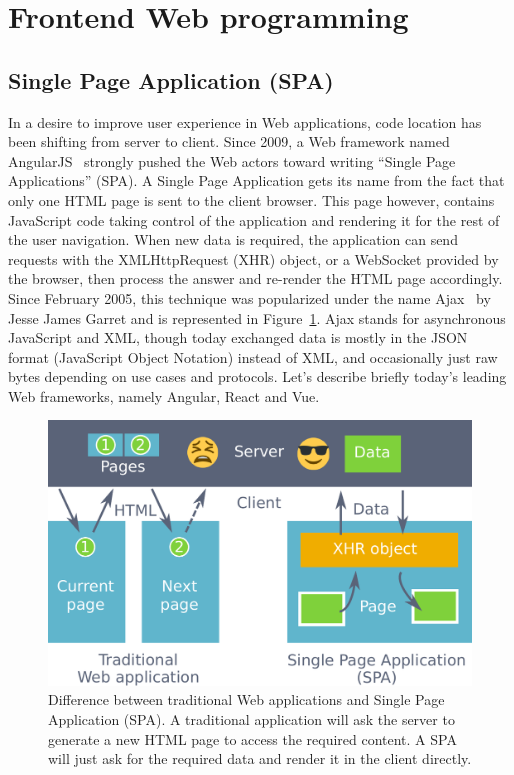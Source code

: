 \section{Frontend Web programming}%
\label{sec:frontend_web_programming}


\subsection{Single Page Application (SPA)}%
\label{sub:single_page_application_spa_}

In a desire to improve user experience in Web applications,
code location has been shifting from server to client.
Since 2009, a Web framework named AngularJS~\cite{hevery2009declarative} strongly pushed
the Web actors toward writing ``Single Page Applications'' (SPA).
A Single Page Application gets its name from the fact that only one
HTML page is sent to the client browser.
This page however, contains JavaScript code taking control
of the application and rendering it for the rest of the user navigation.
When new data is required, the application can send requests
with the XMLHttpRequest (XHR) object, or a WebSocket provided by the browser,
then process the answer and re-render the HTML page accordingly.
Since February 2005, this technique was popularized under the name Ajax~\cite{ajax}
by Jesse James Garret and is represented in Figure~\ref{fig:spa}.
Ajax stands for asynchronous JavaScript and XML,
though today exchanged data is mostly in the JSON format (JavaScript Object Notation) instead of XML,
and occasionally just raw bytes depending on use cases and protocols.
Let's describe briefly today's leading Web frameworks, namely Angular, React and Vue.

\begin{figure}[ht]
	\centering
	\includegraphics[width=1.0\linewidth]{assets/img/spa-bis.pdf}
	\caption{Difference between traditional Web applications and Single Page Application (SPA). A traditional application will ask the server to generate a new HTML page to access the required content. A SPA will just ask for the required data and render it in the client directly.}%
	\label{fig:spa}
\end{figure}

